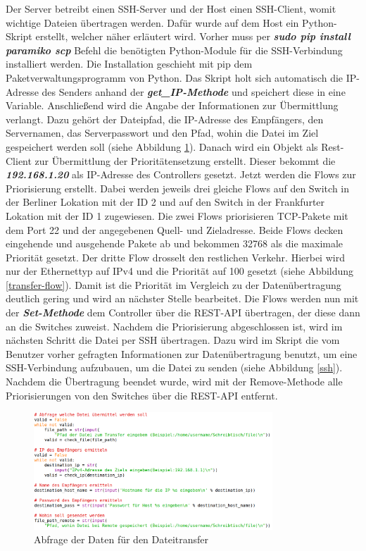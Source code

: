 \documentclass[fontsize=12pt,paper=a4,open=any,parskip=half,
  twoside=false,toc=listof,toc=bibliography,fleqn,leqno,
  captions=nooneline,captions=tableabove,british]{scrbook}
\begin{document}
Der Server betreibt einen SSH-Server und der Host einen SSH-Client, womit wichtige Dateien übertragen werden. Dafür wurde auf dem Host ein Python-Skript erstellt, welcher näher erläutert wird. Vorher muss per \textit{\textbf{sudo pip install paramiko scp}} Befehl die benötigten Python-Module für die SSH-Verbindung installiert werden. Die Installation geschieht mit pip dem Paketverwaltungsprogramm von Python. Das Skript holt sich automatisch die IP-Adresse des Senders anhand der \textit{\textbf{get\_IP-Methode}} und speichert diese in eine Variable. Anschließend wird die Angabe der Informationen zur Übermittlung verlangt. Dazu gehört der Dateipfad, die IP-Adresse des Empfängers, den Servernamen, das Serverpasswort und den Pfad, wohin die Datei im Ziel gespeichert werden soll (siehe Abbildung \ref{transfer-daten}). Danach wird ein Objekt als Rest-Client zur Übermittlung der Prioritätensetzung erstellt. Dieser bekommt die \textit{\textbf{192.168.1.20}} als IP-Adresse des Controllers gesetzt. Jetzt werden die Flows zur Priorisierung erstellt. Dabei werden jeweils drei gleiche Flows auf den Switch in der Berliner Lokation mit der ID 2 und auf den Switch in der Frankfurter Lokation mit der ID 1 zugewiesen. Die zwei Flows priorisieren TCP-Pakete mit dem Port 22 und der angegebenen Quell- und Zieladresse. Beide Flows decken eingehende und ausgehende Pakete ab und bekommen 32768 als die maximale Priorität gesetzt. Der dritte Flow drosselt den restlichen Verkehr. Hierbei wird nur der Ethernettyp auf IPv4 und die Priorität auf 100 gesetzt (siehe Abbildung \ref{transfer-flow}). Damit ist die Priorität im Vergleich zu der Datenübertragung deutlich gering und wird an nächster Stelle bearbeitet. Die Flows werden nun mit der \textit{\textbf{Set-Methode}} dem Controller über die REST-API übertragen, der diese dann an die Switches zuweist. Nachdem die Priorisierung abgeschlossen ist, wird im nächsten Schritt die Datei per SSH übertragen. Dazu wird im Skript die vom Benutzer vorher gefragten Informationen zur Datenübertragung benutzt, um eine SSH-Verbindung aufzubauen, um die Datei zu senden (siehe Abbildung \ref{ssh}). Nachdem die Übertragung beendet wurde, wird mit der Remove-Methode alle Priorisierungen von den Switches über die REST-API entfernt.

\begin{figure}[H]
 \centering
 \includegraphics[width=0.8\textwidth]{Bilder/transfer-daten}
 \captionsetup{justification=centering}
 \caption{Abfrage der Daten für den Dateitransfer}
 \label{transfer-daten}
\end{figure}
\end{document}
